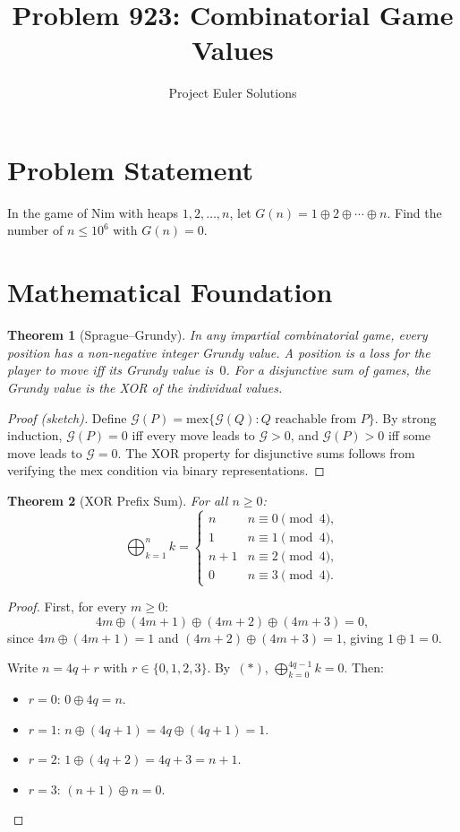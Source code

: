\documentclass[11pt]{article}
\title{Problem 923: Combinatorial Game Values}
\author{Project Euler Solutions}
\date{}
\newtheorem{theorem}{Theorem}
\theoremstyle{definition}
\begin{document}
\maketitle

\section{Problem Statement}

In the game of Nim with heaps $1, 2, \ldots, n$, let $G(n) = 1 \oplus 2 \oplus \cdots \oplus n$. Find the number of $n \leq 10^6$ with $G(n) = 0$.

\section{Mathematical Foundation}

\begin{theorem}[Sprague--Grundy]
In any impartial combinatorial game, every position has a non-negative integer Grundy value. A position is a loss for the player to move iff its Grundy value is~$0$. For a disjunctive sum of games, the Grundy value is the XOR of the individual values.
\end{theorem}

\begin{proof}[Proof (sketch)]
Define $\mathcal{G}(P) = \mathrm{mex}\{\mathcal{G}(Q) : Q \text{ reachable from } P\}$. By strong induction, $\mathcal{G}(P) = 0$ iff every move leads to $\mathcal{G} > 0$, and $\mathcal{G}(P) > 0$ iff some move leads to $\mathcal{G} = 0$. The XOR property for disjunctive sums follows from verifying the mex condition via binary representations.
\end{proof}

\begin{theorem}[XOR Prefix Sum]
For all $n \geq 0$:
\[
\bigoplus_{k=1}^{n} k = \begin{cases}
n & n \equiv 0 \pmod{4}, \\ 1 & n \equiv 1 \pmod{4}, \\
n+1 & n \equiv 2 \pmod{4}, \\ 0 & n \equiv 3 \pmod{4}.
\end{cases}
\]
\end{theorem}

\begin{proof}
First, for every $m \geq 0$:
\[
4m \oplus (4m{+}1) \oplus (4m{+}2) \oplus (4m{+}3) = 0, \tag{$*$}
\]
since $4m \oplus (4m{+}1) = 1$ and $(4m{+}2) \oplus (4m{+}3) = 1$, giving $1 \oplus 1 = 0$.

Write $n = 4q + r$ with $r \in \{0,1,2,3\}$. By~$(*)$, $\bigoplus_{k=0}^{4q-1} k = 0$. Then:
\begin{itemize}
    \item $r = 0$: $0 \oplus 4q = n$.
    \item $r = 1$: $n \oplus (4q{+}1) = 4q \oplus (4q{+}1) = 1$.
    \item $r = 2$: $1 \oplus (4q{+}2) = 4q{+}3 = n{+}1$.
    \item $r = 3$: $(n{+}1) \oplus n = 0$. \qedhere
\end{itemize}
\end{proof}
\end{document}
